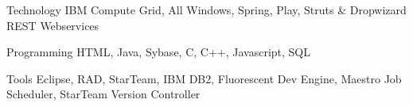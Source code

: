 

\begin{cvskills}

  \cvskill
    {Technology} %
    {IBM Compute Grid, All Windows, Spring, Play, Struts \& Dropwizard REST Webservices} %

  \cvskill
    {Programming} %
    {HTML, Java, Sybase, C, C++, Javascript, SQL} %

  \cvskill
    {Tools} %
    {Eclipse, RAD, StarTeam, IBM DB2, Fluorescent Dev Engine, Maestro Job Scheduler, StarTeam Version Controller} %

\end{cvskills}
